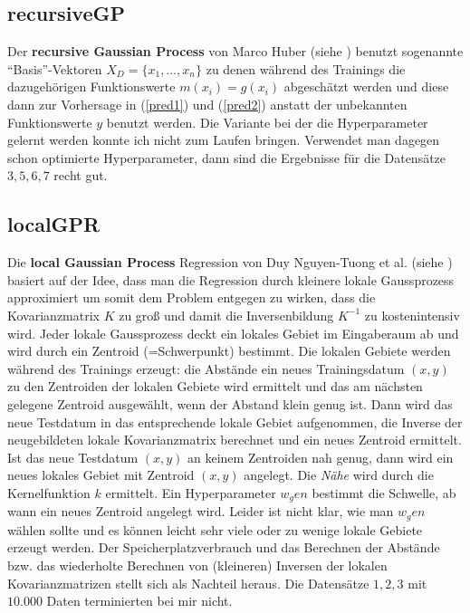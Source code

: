 \documentclass[ngerman]{scrartcl}
\begin{document}
\subsection{recursiveGP}
Der {\bf recursive Gaussian Process} von Marco Huber (siehe \cite{HUBER201485}) benutzt sogenannte ``Basis''-Vektoren $X_D=\{x_1, \ldots, x_n\}$ zu denen während des Trainings die dazugehörigen Funktionswerte $m(x_i)=g(x_i)$ abgeschätzt werden und diese dann zur Vorhersage in  (\ref{pred1}) und (\ref{pred2}) anstatt der unbekannten Funktionswerte $y$ benutzt werden. Die Variante bei der die Hyperparameter gelernt werden konnte ich nicht zum Laufen bringen. Verwendet man dagegen schon optimierte Hyperparameter, dann sind die Ergebnisse für die Datensätze $3, 5,6,7$ recht gut.

\subsection{localGPR}
Die {\bf local Gaussian Process} Regression von Duy Nguyen-Tuong et al. (siehe \cite{DBLP:conf/nips/Nguyen-TuongSP08}) basiert auf der Idee, dass man die Regression durch kleinere lokale Gaussprozess approximiert um somit dem Problem entgegen zu wirken, dass die Kovarianzmatrix $K$ zu groß und damit die Inversenbildung $K^{-1}$ zu kostenintensiv wird. Jeder lokale Gaussprozess deckt ein lokales Gebiet im Eingaberaum ab und wird durch ein Zentroid (=Schwerpunkt) bestimmt. Die lokalen Gebiete werden während des Trainings erzeugt: die Abstände ein neues Trainingsdatum $(x,y)$ zu den Zentroiden der lokalen Gebiete wird ermittelt und das am nächsten gelegene Zentroid ausgewählt, wenn der Abstand klein genug ist. Dann wird das neue Testdatum in das entsprechende lokale Gebiet aufgenommen, die Inverse der neugebildeten lokale Kovarianzmatrix berechnet und ein neues  Zentroid  ermittelt. Ist das neue Testdatum $(x,y)$ an keinem Zentroiden nah genug, dann wird ein neues lokales Gebiet mit Zentroid $(x,y)$ angelegt. Die {\emph{Nähe}} wird durch die Kernelfunktion $k$ ermittelt. Ein Hyperparameter $w_gen$ bestimmt die Schwelle, ab wann ein neues Zentroid angelegt wird. Leider ist nicht klar, wie man $w_gen$ wählen sollte und es können leicht sehr viele oder zu wenige lokale Gebiete erzeugt werden. Der Speicherplatzverbrauch und das Berechnen der Abstände bzw. das wiederholte Berechnen von (kleineren) Inversen der lokalen Kovarianzmatrizen stellt sich als Nachteil heraus. Die Datensätze $1,2,3$ mit $10.000$ Daten terminierten bei mir nicht.
\end{document}
